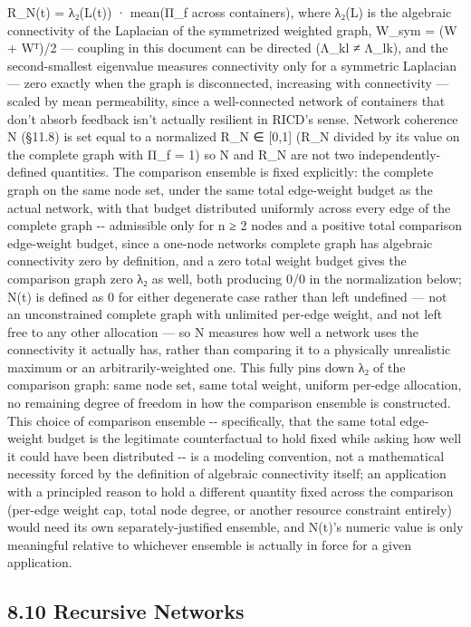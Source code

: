 \documentclass[
]{article}
\begin{document}
R\_N(t) = λ₂(L(t)) · mean(Π\_f across containers), where λ₂(L) is the
algebraic connectivity of the Laplacian of the symmetrized weighted
graph, W\_sym = (W + Wᵀ)/2 --- coupling in this document can be directed
(Λ\_kl ≠ Λ\_lk), and the second-smallest eigenvalue measures
connectivity only for a symmetric Laplacian --- zero exactly when the
graph is disconnected, increasing with connectivity --- scaled by mean
permeability, since a well-connected network of containers that don't
absorb feedback isn't actually resilient in RICD's sense. Network
coherence N (§11.8) is set equal to a normalized R\_N ∈ {[}0,1{]} (R\_N
divided by its value on the complete graph with Π\_f = 1) so N and R\_N
are not two independently-defined quantities. The comparison ensemble is
fixed explicitly: the complete graph on the same node set, under the
same total edge-weight budget as the actual network, with that budget
distributed uniformly across every edge of the complete graph -\/-
admissible only for n ≥ 2 nodes and a positive total comparison
edge-weight budget, since a one-node networks complete graph has
algebraic connectivity zero by definition, and a zero total weight
budget gives the comparison graph zero λ₂ as well, both producing 0/0 in
the normalization below; N(t) is defined as 0 for either degenerate case
rather than left undefined --- not an unconstrained complete graph with
unlimited per-edge weight, and not left free to any other allocation ---
so N measures how well a network uses the connectivity it actually has,
rather than comparing it to a physically unrealistic maximum or an
arbitrarily-weighted one. This fully pins down λ₂ of the comparison
graph: same node set, same total weight, uniform per-edge allocation, no
remaining degree of freedom in how the comparison ensemble is
constructed. This choice of comparison ensemble -\/- specifically, that
the same total edge-weight budget is the legitimate counterfactual to
hold fixed while asking how well it could have been distributed -\/- is
a modeling convention, not a mathematical necessity forced by the
definition of algebraic connectivity itself; an application with a
principled reason to hold a different quantity fixed across the
comparison (per-edge weight cap, total node degree, or another resource
constraint entirely) would need its own separately-justified ensemble,
and N(t)'s numeric value is only meaningful relative to whichever
ensemble is actually in force for a given application.

\hypertarget{recursive-networks}{%
\subsection{8.10 Recursive Networks}\label{recursive-networks}}
\end{document}
